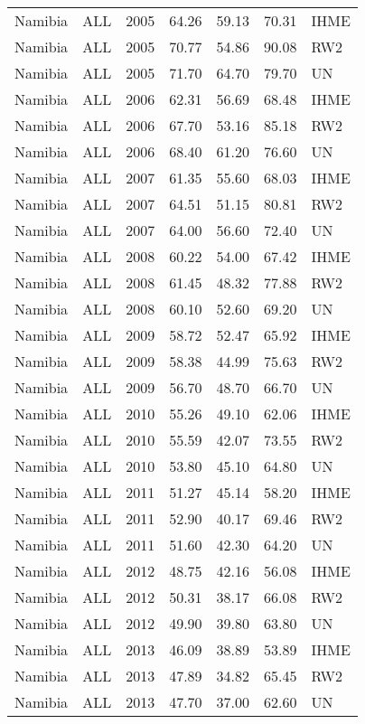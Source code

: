 \begin{longtable}{lllrrrl}
  Namibia & ALL & 2005 & 64.26 & 59.13 & 70.31 & IHME \\ 
  Namibia & ALL & 2005 & 70.77 & 54.86 & 90.08 & RW2 \\ 
  Namibia & ALL & 2005 & 71.70 & 64.70 & 79.70 & UN \\ 
  Namibia & ALL & 2006 & 62.31 & 56.69 & 68.48 & IHME \\ 
  Namibia & ALL & 2006 & 67.70 & 53.16 & 85.18 & RW2 \\ 
  Namibia & ALL & 2006 & 68.40 & 61.20 & 76.60 & UN \\ 
  Namibia & ALL & 2007 & 61.35 & 55.60 & 68.03 & IHME \\ 
  Namibia & ALL & 2007 & 64.51 & 51.15 & 80.81 & RW2 \\ 
  Namibia & ALL & 2007 & 64.00 & 56.60 & 72.40 & UN \\ 
  Namibia & ALL & 2008 & 60.22 & 54.00 & 67.42 & IHME \\ 
  Namibia & ALL & 2008 & 61.45 & 48.32 & 77.88 & RW2 \\ 
  Namibia & ALL & 2008 & 60.10 & 52.60 & 69.20 & UN \\ 
  Namibia & ALL & 2009 & 58.72 & 52.47 & 65.92 & IHME \\ 
  Namibia & ALL & 2009 & 58.38 & 44.99 & 75.63 & RW2 \\ 
  Namibia & ALL & 2009 & 56.70 & 48.70 & 66.70 & UN \\ 
  Namibia & ALL & 2010 & 55.26 & 49.10 & 62.06 & IHME \\ 
  Namibia & ALL & 2010 & 55.59 & 42.07 & 73.55 & RW2 \\ 
  Namibia & ALL & 2010 & 53.80 & 45.10 & 64.80 & UN \\ 
  Namibia & ALL & 2011 & 51.27 & 45.14 & 58.20 & IHME \\ 
  Namibia & ALL & 2011 & 52.90 & 40.17 & 69.46 & RW2 \\ 
  Namibia & ALL & 2011 & 51.60 & 42.30 & 64.20 & UN \\ 
  Namibia & ALL & 2012 & 48.75 & 42.16 & 56.08 & IHME \\ 
  Namibia & ALL & 2012 & 50.31 & 38.17 & 66.08 & RW2 \\ 
  Namibia & ALL & 2012 & 49.90 & 39.80 & 63.80 & UN \\ 
  Namibia & ALL & 2013 & 46.09 & 38.89 & 53.89 & IHME \\ 
  Namibia & ALL & 2013 & 47.89 & 34.82 & 65.45 & RW2 \\ 
  Namibia & ALL & 2013 & 47.70 & 37.00 & 62.60 & UN \\ 

\end{longtable}
